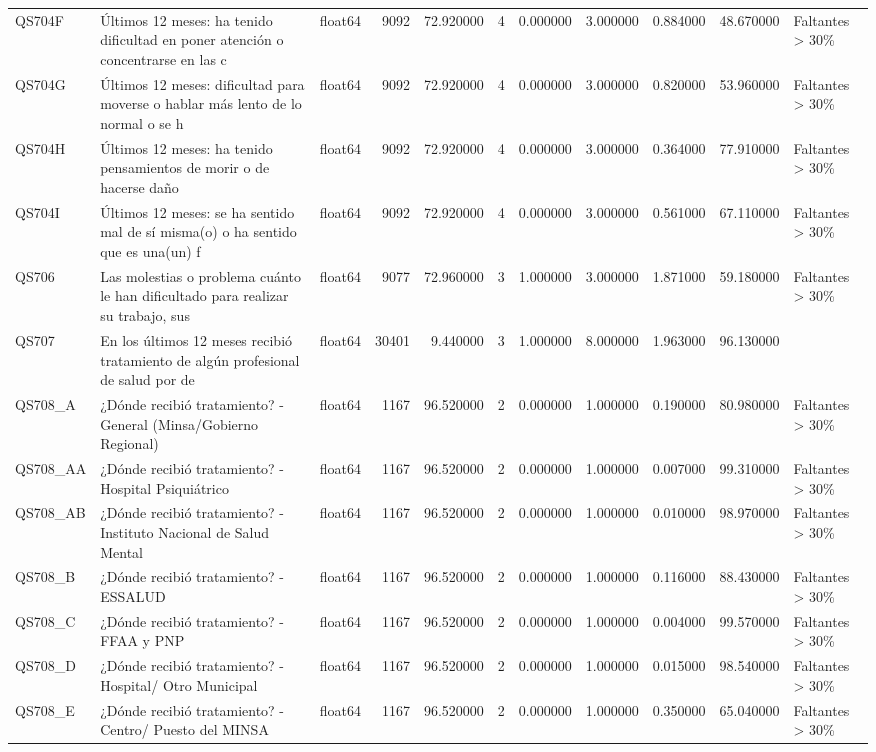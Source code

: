 \begin{longtable}{lllrrrrrrrl}
QS704F & Últimos 12 meses: ha tenido dificultad en poner atención o concentrarse en las c & float64 & 9092 & 72.920000 & 4 & 0.000000 & 3.000000 & 0.884000 & 48.670000 & Faltantes > 30\% \\
QS704G & Últimos 12 meses: dificultad para moverse o hablar más lento de lo normal o se h & float64 & 9092 & 72.920000 & 4 & 0.000000 & 3.000000 & 0.820000 & 53.960000 & Faltantes > 30\% \\
QS704H & Últimos 12 meses: ha tenido pensamientos de morir o de hacerse daño & float64 & 9092 & 72.920000 & 4 & 0.000000 & 3.000000 & 0.364000 & 77.910000 & Faltantes > 30\% \\
QS704I & Últimos 12 meses: se ha sentido mal de sí misma(o) o ha sentido que es una(un) f & float64 & 9092 & 72.920000 & 4 & 0.000000 & 3.000000 & 0.561000 & 67.110000 & Faltantes > 30\% \\
QS706 & Las molestias o problema cuánto le han dificultado para realizar su trabajo, sus & float64 & 9077 & 72.960000 & 3 & 1.000000 & 3.000000 & 1.871000 & 59.180000 & Faltantes > 30\% \\
QS707 & En los últimos 12 meses recibió tratamiento de algún profesional de salud por de & float64 & 30401 & 9.440000 & 3 & 1.000000 & 8.000000 & 1.963000 & 96.130000 &  \\
QS708\_A & ¿Dónde recibió tratamiento? - General (Minsa/Gobierno Regional) & float64 & 1167 & 96.520000 & 2 & 0.000000 & 1.000000 & 0.190000 & 80.980000 & Faltantes > 30\% \\
QS708\_AA & ¿Dónde recibió tratamiento? -  Hospital Psiquiátrico & float64 & 1167 & 96.520000 & 2 & 0.000000 & 1.000000 & 0.007000 & 99.310000 & Faltantes > 30\% \\
QS708\_AB & ¿Dónde recibió tratamiento? -  Instituto Nacional de Salud Mental & float64 & 1167 & 96.520000 & 2 & 0.000000 & 1.000000 & 0.010000 & 98.970000 & Faltantes > 30\% \\
QS708\_B & ¿Dónde recibió tratamiento? - ESSALUD & float64 & 1167 & 96.520000 & 2 & 0.000000 & 1.000000 & 0.116000 & 88.430000 & Faltantes > 30\% \\
QS708\_C & ¿Dónde recibió tratamiento? - FFAA y PNP & float64 & 1167 & 96.520000 & 2 & 0.000000 & 1.000000 & 0.004000 & 99.570000 & Faltantes > 30\% \\
QS708\_D & ¿Dónde recibió tratamiento? -  Hospital/ Otro Municipal & float64 & 1167 & 96.520000 & 2 & 0.000000 & 1.000000 & 0.015000 & 98.540000 & Faltantes > 30\% \\
QS708\_E & ¿Dónde recibió tratamiento? -  Centro/ Puesto del MINSA & float64 & 1167 & 96.520000 & 2 & 0.000000 & 1.000000 & 0.350000 & 65.040000 & Faltantes > 30\% \\

\end{longtable}
